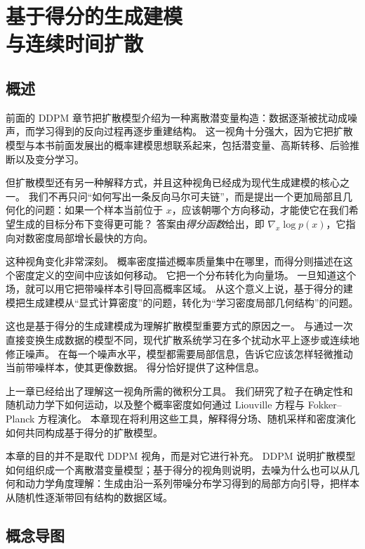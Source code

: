 \chapter[基于得分的生成建模与连续时间扩散]{基于得分的生成建模\\与连续时间扩散}
\section*{概述}

前面的 DDPM 章节把扩散模型介绍为一种离散潜变量构造：数据逐渐被扰动成噪声，而学习得到的反向过程再逐步重建结构。
这一视角十分强大，因为它把扩散模型与本书前面发展出的概率建模思想联系起来，包括潜变量、高斯转移、后验推断以及变分学习。

但扩散模型还有另一种解释方式，并且这种视角已经成为现代生成建模的核心之一。
我们不再只问“如何写出一条反向马尔可夫链”，而是提出一个更加局部且几何化的问题：如果一个样本当前位于 $x$，应该朝哪个方向移动，才能使它在我们希望生成的目标分布下变得更可能？
答案由\emph{得分函数}给出，即
$\nabla_x \log p(x)$，它指向对数密度局部增长最快的方向。

这种视角变化非常深刻。
概率密度描述概率质量集中在哪里，而得分则描述在这个密度定义的空间中应该如何移动。
它把一个分布转化为向量场。
一旦知道这个场，就可以用它把带噪样本引导回高概率区域。
从这个意义上说，基于得分的建模把生成建模从“显式计算密度”的问题，转化为“学习密度局部几何结构”的问题。

这也是基于得分的生成建模成为理解扩散模型重要方式的原因之一。
与通过一次直接变换生成数据的模型不同，现代扩散系统学习在多个扰动水平上逐步或连续地修正噪声。
在每一个噪声水平，模型都需要局部信息，告诉它应该怎样轻微推动当前带噪样本，使其更像数据。
得分恰好提供了这种信息。

上一章已经给出了理解这一视角所需的微积分工具。
我们研究了粒子在确定性和随机动力学下如何运动，以及整个概率密度如何通过 Liouville 方程与 Fokker--Planck 方程演化。
本章现在将利用这些工具，解释得分场、随机采样和密度演化如何共同构成基于得分的扩散模型。

本章的目的并不是取代 DDPM 视角，而是对它进行补充。
DDPM 说明扩散模型如何组织成一个离散潜变量模型；基于得分的视角则说明，去噪为什么也可以从几何和动力学角度理解：生成由沿一系列带噪分布学习得到的局部方向引导，把样本从随机性逐渐带回有结构的数据区域。

\section*{概念导图}

